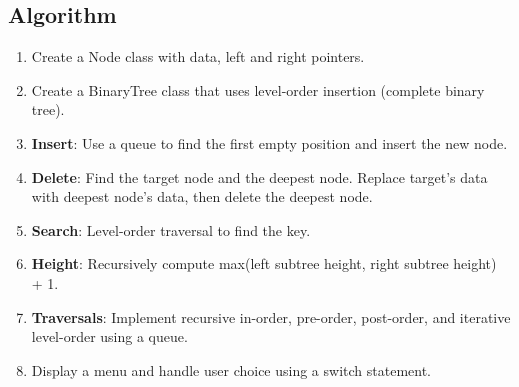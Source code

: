 \documentclass[a4paper,12pt]{article}
\begin{document}
\subsection*{Algorithm}
\begin{enumerate}
    \item Create a Node class with data, left and right pointers.
    \item Create a BinaryTree class that uses level-order insertion (complete binary tree).
    \item \textbf{Insert}: Use a queue to find the first empty position and insert the new node.
    \item \textbf{Delete}: Find the target node and the deepest node. Replace target's data with deepest node's data, then delete the deepest node.
    \item \textbf{Search}: Level-order traversal to find the key.
    \item \textbf{Height}: Recursively compute max(left subtree height, right subtree height) + 1.
    \item \textbf{Traversals}: Implement recursive in-order, pre-order, post-order, and iterative level-order using a queue.
    \item Display a menu and handle user choice using a switch statement.
\end{enumerate}
\end{document}
